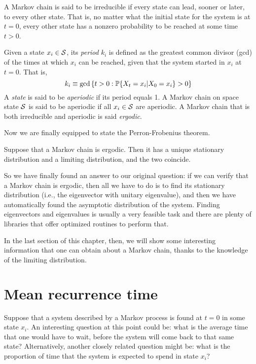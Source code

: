 \begin{ndef} 
    A Markov chain is said to be irreducible if every state can lead, sooner or later, to every other state. That is, no matter what the initial state for the system is at $t=0$, every other state has a nonzero probability to be reached at some time $t>0$.
\end{ndef}
\begin{ndef} 
    Given a state $x_i \in \mathcal{S}$, its \emph{period} $k_i$ is defined as the greatest common divisor (gcd) of the times at which $x_i$ can be reached, given that the system started in $x_i$ at $t=0$. That is,
    \begin{equation}
        k_i \equiv \text{gcd} \left\{ t>0 : \mathbb{P}\{X_t = x_i | X_0 = x_i\} > 0 \right\}
    \end{equation} 
    A \emph{state} is said to be \emph{aperiodic} if its period equals 1. A Markov chain on space state $\mathcal{S}$ is said to be aperiodic if all $x_i \in \mathcal{S}$ are aperiodic. A Markov chain that is both irreducible and aperiodic is said \emph{ergodic}.
\end{ndef}
Now we are finally equipped to state the Perron-Frobenius theorem.

\begin{theorem}
    Suppose that a Markov chain is ergodic. Then it has a unique stationary distribution and a limiting distribution, and the two coincide.
\end{theorem}

\medskip
So we have finally found an answer to our original question: if we can verify that a Markov chain is ergodic, then all we have to do is to find its stationary distribution (i.e., the eigenvector with unitary eigenvalue), and then we have automatically found the asymptotic distribution of the system. Finding eigenvectors and eigenvalues is usually a very feasible task and there are plenty of libraries that offer optimized routines to perform that. 

In the last section of this chapter, then, we will show some interesting information that one can obtain about a Markov chain, thanks to the knowledge of the limiting distribution.

\section{Mean recurrence time}
Suppose that a system described by a Markov process is found at $t = 0$ in some state $x_i$. An interesting question at this point could be: what is the average time that one would have to wait, before the system will come back to that same state? Alternatively, another closely related question might be: what is the proportion of time that the system is expected to spend in state $x_i$?


